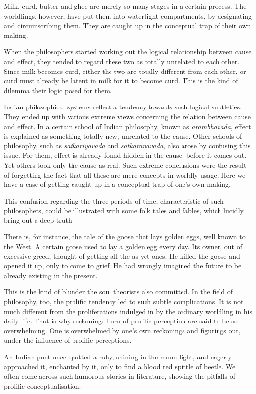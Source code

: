 Milk, curd, butter and ghee are merely so many stages in a certain process. The worldlings, however, have put them into watertight compartments, by designating and circumscribing them. They are caught up in the conceptual trap of their own making.

When the philosophers started working out the logical relationship between cause and effect, they tended to regard these two as totally unrelated to each other. Since milk becomes curd, either the two are totally different from each other, or curd must already be latent in milk for it to become curd. This is the kind of dilemma their logic posed for them.

Indian philosophical systems reflect a tendency towards such logical subtleties. They ended up with various extreme views concerning the relation between cause and effect. In a certain school of Indian philosophy, known as \emph{ārambhavāda}, effect is explained as something totally new, unrelated to the cause. Other schools of philosophy, such as \emph{satkāriyavāda} and \emph{satkaraṇavāda}, also arose by confusing this issue. For them, effect is already found hidden in the cause, before it comes out. Yet others took only the cause as real. Such extreme conclusions were the result of forgetting the fact that all these are mere concepts in worldly usage. Here we have a case of getting caught up in a conceptual trap of one's own making.

This confusion regarding the three periods of time, characteristic of such philosophers, could be illustrated with some folk tales and fables, which lucidly bring out a deep truth.

There is, for instance, the tale of the goose that lays golden eggs, well known to the West. A certain goose used to lay a golden egg every day. Its owner, out of excessive greed, thought of getting all the as yet ones. He killed the goose and opened it up, only to come to grief. He had wrongly imagined the future to be already existing in the present.

This is the kind of blunder the soul theorists also committed. In the field of philosophy, too, the prolific tendency led to such subtle complications. It is not much different from the proliferations indulged in by the ordinary worldling in his daily life. That is why reckonings born of prolific perception are said to be so overwhelming. One is overwhelmed by one's own reckonings and figurings out, under the influence of prolific perceptions.

An Indian poet once spotted a ruby, shining in the moon light, and eagerly approached it, enchanted by it, only to find a blood red spittle of beetle. We often come across such humorous stories in literature, showing the pitfalls of prolific conceptualisation.

